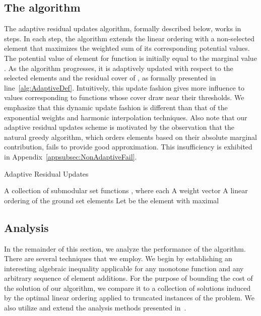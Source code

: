\documentclass[11pt]{article}
\theoremstyle{plain}
\theoremstyle{definition}
\begin{document}
\subsection{The algorithm} \label{subsec:Algorithm}

The adaptive residual updates algorithm, formally described below,
works in steps. In each step, the algorithm extends the linear
ordering with a non-selected element that maximizes the weighted
sum of its corresponding potential values. The potential value
 of element  for function  is initially equal to
the marginal value . As the algorithm
progresses, it is adaptively updated with respect to the selected
elements and the residual cover of , as formally presented in
line~\ref{alg:AdaptiveDef}. Intuitively, this update fashion gives
more influence to values corresponding to functions whose cover
draw near their thresholds. We emphasize that this dynamic update
fashion is different than that of the exponential weights and
harmonic interpolation techniques. Also note that our adaptive
residual updates scheme is motivated by the observation that the
natural greedy algorithm, which orders elements based on their
absolute marginal contribution, fails to provide good
approximation. This insufficiency is exhibited in
Appendix~\ref{appsubsec:NonAdaptiveFail}.

\begin{algorithm}
\caption{Adaptive Residual Updates}\label{cap:AdaptiveUpdate}\begin{algorithmic}[1]
\Require A collection of  submodular set functions , where each  \Statex \qquad\quad A weight vector  \Ensure A linear ordering  of the ground set elements \smallskip 
\State  {}  \ForAll{} \State  \label{alg:AdaptiveDef} \EndFor \EndFor \State Let  be the element with maximal  \State  \State  \EndFor \end{algorithmic}
\end{algorithm}


\subsection{Analysis} \label{subsec:Analysis}

In the remainder of this section, we analyze the performance of
the algorithm. There are several techniques that we employ. We
begin by establishing an interesting algebraic inequality
applicable for any monotone function and any arbitrary sequence of
element additions. For the purpose of bounding the cost of the
solution of our algorithm, we compare it to a collection of
solutions induced by the optimal linear ordering applied to
truncated instances of the problem. We also utilize and extend the
analysis methods presented in~\cite{FeigeLT04,AzarGY09}.
\end{document}
